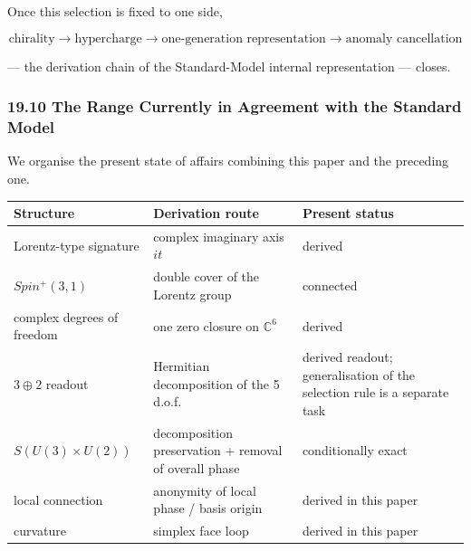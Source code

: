 \documentclass[
  a4paper,
]{article}
\newcounter{none} %
\begin{document}
Once this selection is fixed to one side,

\[
\boxed{
\text{chirality}
\to
\text{hypercharge}
\to
\text{one-generation representation}
\to
\text{anomaly cancellation}
}
\]

--- the derivation chain of the Standard-Model internal representation
--- closes.

\subsubsection{19.10 The Range Currently in Agreement with the Standard
Model}\label{the-range-currently-in-agreement-with-the-standard-model}

We organise the present state of affairs combining this paper and the
preceding one.

{\def\LTcaptype{none} %
\begin{longtable}[]{@{}
  >{\raggedright\arraybackslash}p{}
  >{\raggedright\arraybackslash}p{}
  >{\raggedright\arraybackslash}p{}@{}}
\toprule\noalign{}
\begin{minipage}[b]{\linewidth}\raggedright
Structure
\end{minipage} & \begin{minipage}[b]{\linewidth}\raggedright
Derivation route
\end{minipage} & \begin{minipage}[b]{\linewidth}\raggedright
Present status
\end{minipage} \\
\midrule\noalign{}
\endhead
\bottomrule\noalign{}
\endlastfoot
Lorentz-type signature & complex imaginary axis \(it\) & derived \\
\(Spin^+(3,1)\) & double cover of the Lorentz group & connected \\
5 complex degrees of freedom & one zero closure on \(\mathbb C^6\) &
derived \\
\(3\oplus2\) readout & Hermitian decomposition of the 5 d.o.f. & derived
readout; generalisation of the selection rule is a separate task \\
\(S(U(3)\times U(2))\) & decomposition preservation + removal of overall
phase & conditionally exact \\
local connection & anonymity of local phase / basis origin & derived in
this paper \\
curvature & simplex face loop & derived in this paper \\

\end{longtable}}
\end{document}
